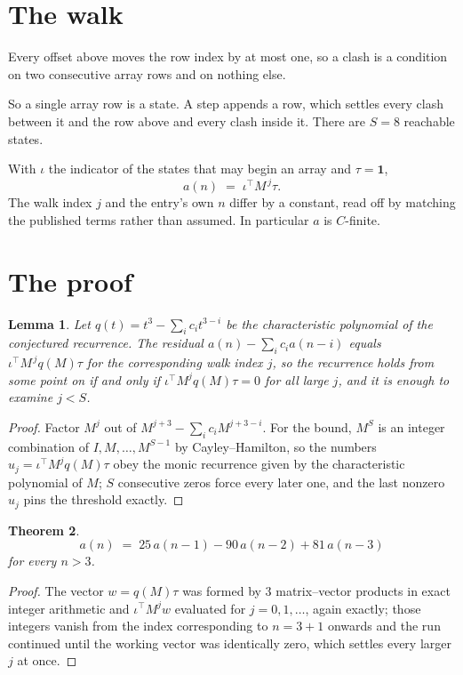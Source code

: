 \documentclass[11pt,a4paper]{article}
\theoremstyle{plain}
\newtheorem{theorem}{Theorem}
\newtheorem{lemma}[theorem]{Lemma}
\theoremstyle{definition}
\begin{document}
\section{The walk}

Every offset above moves the row index by at most one, so a clash is a condition on two
consecutive array rows and on nothing else.

So a single array row is a state. A step appends a row, which settles every clash between it
and the row above and every clash inside it. There are $S=8$ reachable states.

With $\iota$ the indicator of the states that may begin an array and $\tau=\mathbf{1}$,
\[
a(n)\;=\;\iota^{\!\top}M^{\,j}\tau .
\]
The walk index $j$ and the entry's own $n$ differ by a constant, read off by matching the
published terms rather than assumed. In particular $a$ is $C$-finite.

\section{The proof}

\begin{lemma}\label{lem:crit}
Let $q(t)=t^{3}-\sum_i c_it^{3-i}$ be the characteristic polynomial of the
conjectured recurrence. The residual $a(n)-\sum_ic_ia(n-i)$ equals
$\iota^{\!\top}M^{\,j}q(M)\tau$ for the corresponding walk index $j$, so the recurrence
holds from some point on if and only if $\iota^{\!\top}M^{j}q(M)\tau=0$ for all large $j$,
and it is enough to examine $j<S$.
\end{lemma}

\begin{proof}
Factor $M^{j}$ out of $M^{j+3}-\sum_ic_iM^{j+3-i}$. For the bound, $M^{S}$
is an integer combination of $I,M,\dots,M^{S-1}$ by Cayley--Hamilton, so the numbers
$u_j=\iota^{\!\top}M^{j}q(M)\tau$ obey the monic recurrence given by the characteristic
polynomial of $M$; $S$ consecutive zeros force every later one, and the last nonzero $u_j$
pins the threshold exactly.
\end{proof}

\begin{theorem}
\[
a(n)\;=\;25\,a(n-1) - 90\,a(n-2) + 81\,a(n-3)
\]
for every $n>3$.
\end{theorem}

\begin{proof}
The vector $w=q(M)\tau$ was formed by $3$ matrix--vector products in exact integer
arithmetic and $\iota^{\!\top}M^{j}w$ evaluated for $j=0,1,\dots$, again exactly; those
integers vanish from the index corresponding to $n=3+1$ onwards and the run continued
until the working vector was identically zero, which settles every larger $j$ at once.
\end{proof}
\end{document}
